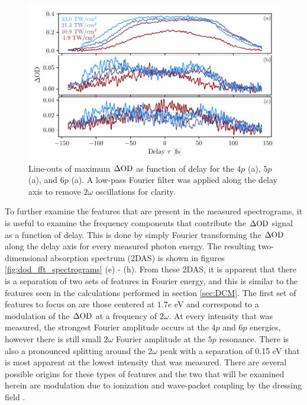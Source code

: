 \begin{figure}
	\centering
	\includegraphics[width=1.0\textwidth]{figures/ATS/dOD_max_lineouts.pdf}
	\caption[Line-outs along maximum $\dod(\tau)$ for $np$ states]{Line-outs of maximum $\Delta\mathrm{OD}$ as function of delay for the $4p$ (a), $5p$ (a), and $6p$ (a).  A low-pass Fourier filter was applied along the delay axis to remove $2\omega$ oscillations for clarity.}
	\label{fig:dOD_max_lineouts}
\end{figure}


To further examine the features that are present in the measured spectrograms, it is useful to examine the frequency components that contribute the $\Delta\mathrm{OD}$ signal as a function of delay.  This is done by simply Fourier transforming the $\Delta\mathrm{OD}$ along the delay axis for every measured photon energy. The resulting two-dimensional absorption spectrum (2DAS) is shown in figures \ref{fig:dod_fft_spectrograms} (e) - (h).  From these 2DAS, it is apparent that there is a separation of two sets of features in Fourier energy, and this is similar to the features seen in the calculations performed in section \ref{sec:DCM}.  The first set of features to focus on are those centered at $1.7e$ eV and correspond to a modulation of the $\Delta\mathrm{OD}$ at a frequency of $2\omega$.  At every intensity that was measured, the strongest Fourier amplitude occurs at the $4p$ and $6p$ energies, however there is still small $2\omega$ Fourier amplitude at the $5p$ resonance.  There is also a pronounced splitting around the $2\omega$ peak with a separation of 0.15 eV that is most apparent at the lowest intensity that was measured.  There are several possible origins for these types of features and the two that will be examined herein are modulation due to ionization and wave-packet coupling by the dressing field \cite{ottReconstructionControlTimedependent2014}.   

